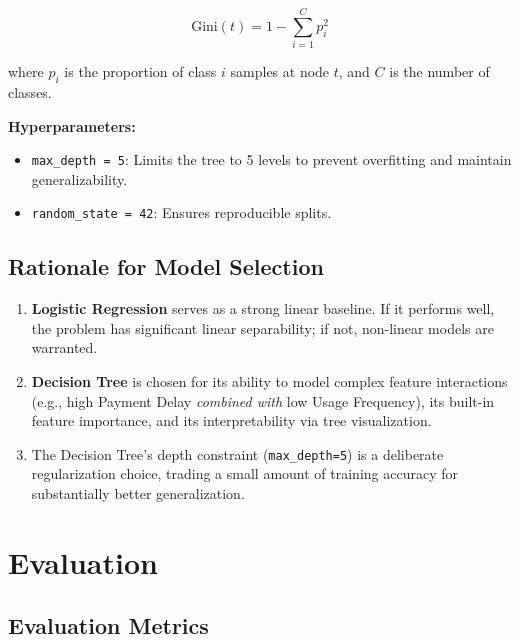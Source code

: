 \documentclass[12pt, a4paper]{article}
\begin{document}
\begin{equation}
    \text{Gini}(t) = 1 - \sum_{i=1}^{C} p_i^2
\end{equation}

where $p_i$ is the proportion of class $i$ samples at node $t$, and $C$ is the number of classes.

\textbf{Hyperparameters:}
\begin{itemize}
    \item \texttt{max\_depth = 5}: Limits the tree to 5 levels to prevent overfitting and maintain generalizability.
    \item \texttt{random\_state = 42}: Ensures reproducible splits.
\end{itemize}

\subsection{Rationale for Model Selection}

\begin{enumerate}
    \item \textbf{Logistic Regression} serves as a strong linear baseline. If it performs well, the problem has significant linear separability; if not, non-linear models are warranted.
    \item \textbf{Decision Tree} is chosen for its ability to model complex feature interactions (e.g., high Payment Delay \textit{combined with} low Usage Frequency), its built-in feature importance, and its interpretability via tree visualization.
    \item The Decision Tree's depth constraint (\texttt{max\_depth=5}) is a deliberate regularization choice, trading a small amount of training accuracy for substantially better generalization.
\end{enumerate}

\section{Evaluation}
\label{sec:results}

\subsection{Evaluation Metrics}
\end{document}
